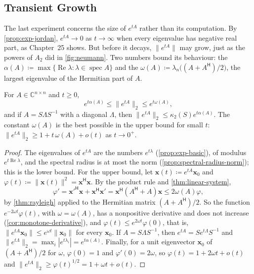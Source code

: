 \subsection{Transient Growth}

The last experiment concerns the size of $e^{tA}$ rather than its computation. By \cref{prop:exp-jordan}, $e^{tA}\to0$ as $t\to\infty$ when every eigenvalue has negative real part, as Chapter~25 shows. But before it decays, $\|e^{tA}\|$ may grow, just as the powers of $A_2$ did in \cref{fig:neumann}. Two numbers bound its behaviour: the  $\alpha(A)\coloneqq\max\{\operatorname{Re}\lambda:\lambda\in\operatorname{spec}A\}$ and the  $\omega(A)\coloneqq\lambda_n\bigl((A+A^{\mathsf H})/2\bigr)$, the largest eigenvalue of the Hermitian part of $A$.

\begin{proposition}
\label{prop:exp-norm-bounds}
For $A\in\mathbb C^{n\times n}$ and $t\ge0$,
\[
e^{t\alpha(A)}\le\|e^{tA}\|_2\le e^{t\omega(A)} ,
\]
and if $A=S\Lambda S^{-1}$ with a diagonal $\Lambda$, then $\|e^{tA}\|_2\le\kappa_2(S)e^{t\alpha(A)}$. The constant $\omega(A)$ is the best possible in the upper bound for small $t$: $\|e^{tA}\|_2\ge1+t\,\omega(A)+o(t)$ as $t\to0^+$.
\end{proposition}

\begin{proof}
The eigenvalues of $e^{tA}$ are the numbers $e^{t\lambda}$ (\cref{prop:exp-basic}), of modulus $e^{t\operatorname{Re}\lambda}$, and the spectral radius is at most the norm (\cref{prop:spectral-radius-norm}); this is the lower bound. For the upper bound, let $\mathbf x(t)\coloneqq e^{tA}\mathbf x_0$ and $\varphi(t)\coloneqq\|\mathbf x(t)\|^2=\mathbf x^{\mathsf H}\mathbf x$. By the product rule and \cref{thm:linear-system},
\[
\varphi'=\mathbf x'^{\mathsf H}\mathbf x+\mathbf x^{\mathsf H}\mathbf x'=\mathbf x^{\mathsf H}(A^{\mathsf H}+A)\mathbf x\le2\omega(A)\varphi ,
\]
by \cref{thm:rayleigh} applied to the Hermitian matrix $(A+A^{\mathsf H})/2$. So the function $e^{-2\omega t}\varphi(t)$, with $\omega=\omega(A)$, has a nonpositive derivative and does not increase (\cref{cor:monotone-derivative}), and $\varphi(t)\le e^{2\omega t}\varphi(0)$, that is, $\|e^{tA}\mathbf x_0\|\le e^{\omega t}\|\mathbf x_0\|$ for every $\mathbf x_0$. If $A=S\Lambda S^{-1}$, then $e^{tA}=Se^{t\Lambda}S^{-1}$ and $\|e^{t\Lambda}\|_2=\max_i|e^{t\lambda_i}|=e^{t\alpha(A)}$. Finally, for a unit eigenvector $\mathbf x_0$ of $(A+A^{\mathsf H})/2$ for $\omega$, $\varphi(0)=1$ and $\varphi'(0)=2\omega$, so $\varphi(t)=1+2\omega t+o(t)$ and $\|e^{tA}\|_2\ge\varphi(t)^{1/2}=1+\omega t+o(t)$.
\end{proof}

